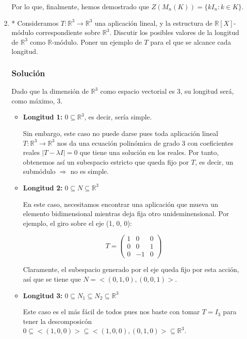 \documentclass[paper=a4, fontsize=11pt, spanish]{scrartcl}
\begin{document}
\begin{enumerate}
		Por lo que, finalmente, hemos demostrado que $Z(M_n(K)) = \{kI_n: k \in K\}$.
		
		\item * Consideramos $T: \mathbb{R}^3 \rightarrow \mathbb{R}^3$ una aplicación lineal, y la estructura
		de $\mathbb{R}[X]$-módulo correspondiente sobre $\mathbb{R}^3$. Discutir los posibles valores de la
		longitud de $\mathbb{R}^3$ como $\mathbb{R}$-módulo. Poner un ejemplo de $T$ para el que se alcance
		cada longitud.
		\subsubsection*{Solución}
		Dado que la dimensión de $\mathbb{R}^3$ como espacio vectorial es 3, su longitud será, como máximo, 3.
		
		\begin{itemize}
			\item \textbf{Longitud 1:} $0 \subseteq \mathbb{R}^3$, es decir, sería simple.
			
			Sin embargo, este caso no puede darse pues toda aplicación lineal $T: \mathbb{R}^3 \rightarrow
			\mathbb{R}^3$ nos da una ecuación polinómica de grado 3 con coeficientes reales $|T - \lambda I|
			= 0$ que tiene una solución en los reales. Por tanto, obtenemos así un subespacio estricto que
			queda fijo por $T$, es decir, un submódulo $\Rightarrow$ no es simple.
			
			\item \textbf{Longitud 2:} $0 \subseteq N \subseteq \mathbb{R}^3$
			
			En este caso, necesitamos encontrar una aplicación que mueva un elemento bidimensional mientras
			deja fija otro unideminensional. Por ejemplo, el giro sobre el eje (1, 0, 0):
			
			$$T = \begin{pmatrix}
				1 & 0 & 0 \\
				0 & 0 & 1 \\
				0 & -1 & 0
			\end{pmatrix}$$
			
			Claramente, el subespacio generado por el eje queda fijo por esta acción, así que se tiene que
			$N = <(0, 1, 0), (0, 0, 1)>$.
			
			\item \textbf{Longitud 3:} $0 \subseteq N_1 \subseteq N_2 \subseteq \mathbb{R}^3$
			
			Este caso es el más fácil de todos pues nos baste con tomar $T = I_3$ para tener la descomposicón
			$0 \subseteq <(1, 0, 0)> \subseteq <(1, 0, 0), (0, 1, 0)> \subseteq \mathbb{R}^3$.
		\end{itemize}
		

\end{enumerate}
\end{document}
